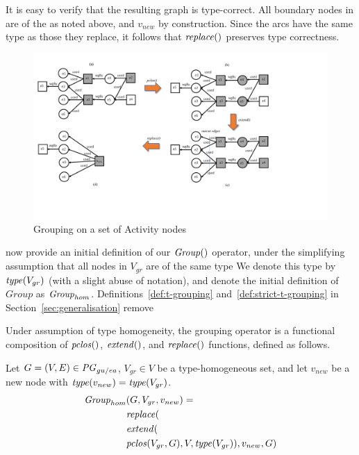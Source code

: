 It is easy to verify that the resulting graph is type-correct. All boundary nodes in   are of the  as noted above, and   $v_{new}$   by construction.
Since the arcs have the same type as those they replace, it follows that $\mathit{replace}()$ preserves type correctness.



\begin{figure}
\centering
\includegraphics[scale=.45]{reworked-fig8.pdf} 
\caption{Grouping on a set of Activity nodes} \label{fig:convex-a-only}
\end{figure}

 now provide an initial definition of our $\mathit{Group}()$ operator, under the simplifying assumption that all nodes in $V_{gr}$ are of the same type   We denote this type by $\mathit{type}(V_{gr})$ (with a slight abuse of notation), and denote the initial definition of $Group$ as $\mathit{Group}_{hom}$. Definitions~\ref{def:t-grouping} and~\ref{def:strict-t-grouping}  in Section~\ref{sec:generalisation} remove 


%
Under assumption of type homogeneity, the grouping operator is a functional composition of $\mathit{pclos}()$, $\mathit{extend}()$, and $\mathit{replace}()$ functions, defined as follows.

\vspace*{10pt}
\begin{definition}
Let $G=(V,E) \in \mathit{PG}_{gu/ea}$, $V_{gr} \in V$ be a type-homogeneous set, and let $v_{new}$ be a new node with $\mathit{type}(v_{new}) = \mathit{type}(V_{gr})$.
\begin{align*}
\group_{hom} &  (G, V_{gr}, v_{new}) = \\
 & \repl(  \\
 & \extend( \\
 & \clos(V_{gr},\jwb{G}), V, \type(V_{gr})), v_{new},  G ) 
\end{align*}
\label{def:homo-group}
\end{definition}


